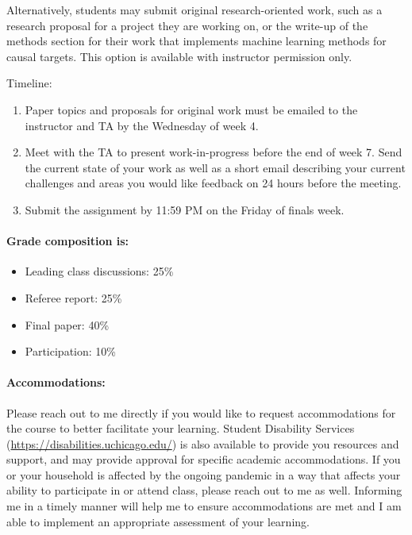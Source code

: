 \documentclass[letterpaper, 12pt, parskip=full,DIV=10]{scrartcl}
\begin{document}
Alternatively, students may submit original research-oriented work, such as a research proposal for a project they are working on, or the write-up of the methods section for their work that implements machine learning methods for causal targets. This option is available with instructor permission only.

Timeline:
\begin{enumerate}
\item Paper topics and proposals for original work must be emailed to the instructor and TA by the Wednesday of week 4.  
\item Meet with the TA to present work-in-progress before the end of week 7. Send the current state of your work as well as a short email describing your current challenges and areas you would like feedback on 24 hours before the meeting. 
\item Submit the assignment by 11:59 PM on the Friday of finals week.
\end{enumerate}

\paragraph{Grade composition is:}

\begin{itemize}[topsep=0pt,itemsep=-1ex,partopsep=1ex,parsep=1ex]
\item Leading class discussions: 25\% 
\item Referee report: 25\%
\item Final paper: 40\%
\item Participation: 10\%
\end{itemize}

\paragraph{Accommodations:} Please reach out to me directly if you would like to request accommodations for the course to better facilitate your learning. Student Disability Services (\url{https://disabilities.uchicago.edu/}) is also available to provide you resources and support, and may provide approval for specific academic accommodations. If you or your household is affected by the ongoing pandemic in a way that affects your ability to participate in or attend class, please reach out to me as well. Informing me in a timely manner will help me to ensure accommodations are met and I am able to implement an appropriate assessment of your learning. 
\end{document}
